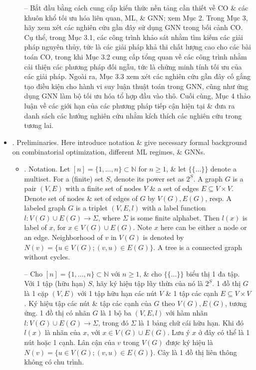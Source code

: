 \documentclass{article}
\begin{document}
\begin{itemize}
\begin{itemize}
        -- Bắt đầu bằng cách cung cấp kiến thức nền tảng cần thiết về CO \& các khuôn khổ tối ưu hóa liên quan, ML, \& GNN; xem Mục 2. Trong Mục 3, hãy xem xét các nghiên cứu gần đây sử dụng GNN trong bối cảnh CO. Cụ thể, trong Mục 3.1, các công trình khảo sát nhằm tìm kiếm các giải pháp nguyên thủy, tức là các giải pháp khả thi chất lượng cao cho các bài toán CO, trong khi Mục 3.2 cung cấp tổng quan về các công trình nhằm cải thiện các phương pháp đối ngẫu, tức là chứng minh tính tối ưu của các giải pháp. Ngoài ra, Mục 3.3 xem xét các nghiên cứu gần đây cố gắng tạo điều kiện cho hành vi suy luận thuật toán trong GNN, cũng như ứng dụng GNN làm bộ tối ưu hóa tổ hợp đầu vào thô. Cuối cùng, Mục 4 thảo luận về các giới hạn của các phương pháp tiếp cận hiện tại \& đưa ra danh sách các hướng nghiên cứu nhằm kích thích các nghiên cứu trong tương lai.
    \end{itemize}
    \item {. Preliminaries.} Here introduce notation \& give necessary formal background on combinatorial optimization, different ML regimes, \& GNNs.
    \begin{itemize}
        \item {. Notation.} Let $[n] = \{1,\ldots,n\}\subset\mathbb{N}$ for $n\ge1$, \& let $\{\{\ldots\}\}$ denote a multiset. For a (finite) set $S$, denote its power set as $2^S$. A graph $G$ is a pair $(V,E)$ with a finite set of nodes $V$ \& a set of edges $E\subseteq V\times V$. Denote set of nodes \& set of edges of $G$ by $V(G),E(G)$, resp. A labeled graph $G$ is a triplet $(V,E,l)$ with a label function $l:V(G)\cup E(G)\to\Sigma$, where $\Sigma$ is some finite alphabet. Then $l(x)$ is label of $x$, for $x\in V(G)\cup E(G)$. Note $x$ here can be either a node or an edge. Neighborhood of $v$ in $V(G)$ is denoted by $N(v) = \{u\in V(G);(v,u)\in E(G)\}$. A tree is a connected graph without cycles.

        -- Cho $[n] = \{1,\ldots,n\}\subset\mathbb{N}$ với $n\ge1$, \& cho $\{\{\ldots\}\}$ biểu thị 1 đa tập. Với 1 tập (hữu hạn) $S$, hãy ký hiệu tập lũy thừa của nó là $2^S$. 1 đồ thị $G$ là 1 cặp $(V,E)$ với 1 tập hữu hạn các nút $V$ \& 1 tập các cạnh $E\subseteq V\times V$. Ký hiệu tập các nút \& tập các cạnh của $G$ theo $V(G),E(G)$, tương ứng. 1 đồ thị có nhãn $G$ là 1 bộ ba $(V,E,l)$ với hàm nhãn $l:V(G)\cup E(G)\to\Sigma$, trong đó $\Sigma$ là 1 bảng chữ cái hữu hạn. Khi đó $l(x)$ là nhãn của $x$, với $x\in V(G)\cup E(G)$. Lưu ý $x$ ở đây có thể là 1 nút hoặc 1 cạnh. Lân cận của $v$ trong $V(G)$ được ký hiệu là $N(v) = \{u\in V(G);(v,u)\in E(G)\}$. Cây là 1 đồ thị liên thông không có chu trình.


\end{itemize}
\end{itemize}
\end{document}
